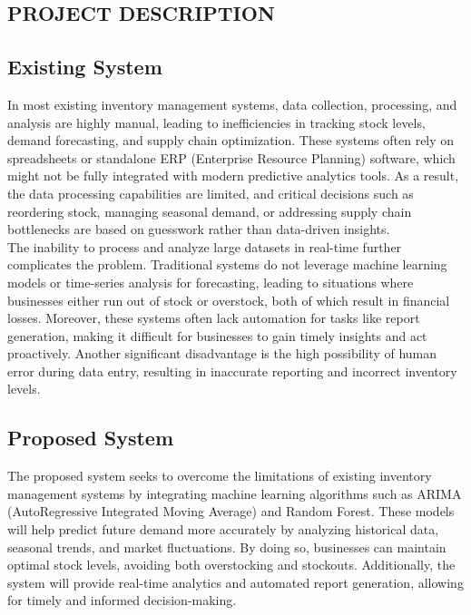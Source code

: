 \documentclass[10pt]{report}
\begin{document}
\begin{center}
\linespread{1.5}
\chapter{PROJECT DESCRIPTION}
\section{Existing System}
In most existing inventory management systems, data collection, processing, and analysis are highly manual, leading to inefficiencies in tracking stock levels, demand forecasting, and supply chain optimization. These systems often rely on spreadsheets or standalone ERP (Enterprise Resource Planning) software, which might not be fully integrated with modern predictive analytics tools. As a result, the data processing capabilities are limited, and critical decisions such as reordering stock, managing seasonal demand, or addressing supply chain bottlenecks are based on guesswork rather than data-driven insights.\\

The inability to process and analyze large datasets in real-time further complicates the problem. Traditional systems do not leverage machine learning models or time-series analysis for forecasting, leading to situations where businesses either run out of stock or overstock, both of which result in financial losses. Moreover, these systems often lack automation for tasks like report generation, making it difficult for businesses to gain timely insights and act proactively. Another significant disadvantage is the high possibility of human error during data entry, resulting in inaccurate reporting and incorrect inventory levels.

\section{Proposed System}
The proposed system seeks to overcome the limitations of existing inventory management systems by integrating machine learning algorithms such as ARIMA (AutoRegressive Integrated Moving Average) and Random Forest. These models will help predict future demand more accurately by analyzing historical data, seasonal trends, and market fluctuations. By doing so, businesses can maintain optimal stock levels, avoiding both overstocking and stockouts. Additionally, the system will provide real-time analytics and automated report generation, allowing for timely and informed decision-making.\\


\end{center}
\end{document}
